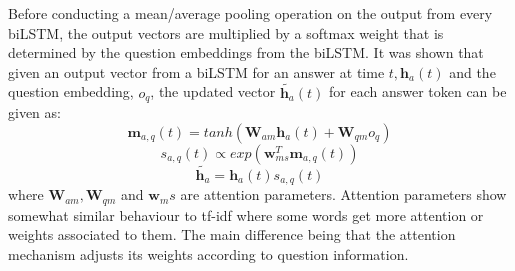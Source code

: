 \documentclass[a4paper,12pt]{report}
\begin{document}
            Before conducting a mean/average pooling operation on the output from every biLSTM, the output vectors are multiplied by a softmax weight that is determined by the question embeddings from the biLSTM.
            It was shown that given an output vector from a biLSTM for an answer at time $ t, \textbf{h}_{a}(t)$ and the question embedding, $ o_q $, the updated vector $  \tilde{\textbf{h}_{a}}(t)$ for each answer token
            can be given as:
            \begin{equation}\label{bilstmAttentioneq}
                \textbf{m}_{a,q}(t) = tanh(\textbf{W}_{am}\textbf{h}_{a}(t) + \textbf{W}_{qm}o_{q})
            \end{equation}
            \begin{equation}\label{bilstmattentioneq2}
                s_{a,q}(t) \propto exp(\textbf{w}^{T}_{ms}\textbf{m}_{a,q}(t))
            \end{equation}
            \begin{equation}\label{bilstmattentioneq3}
               \tilde{\textbf{h}_{a}} = \textbf{h}_{a}(t)s_{a,q}(t)
            \end{equation}
            where  $ \textbf{W}_{am}, \textbf{W}_{qm} $ and $ \textbf{w}_ms $ are attention parameters. Attention parameters show somewhat similar behaviour to tf-idf  where some words get more attention or weights associated to them. The main difference being that the attention mechanism adjusts its weights according to question information.
\end{document}
